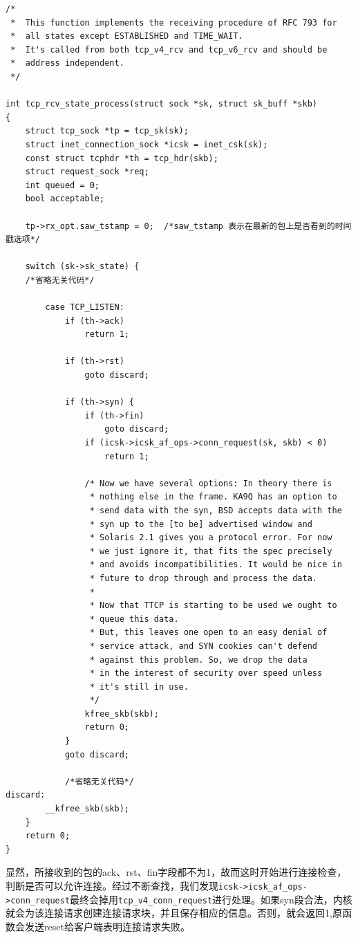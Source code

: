 \begin{verbatim}
/*
 *  This function implements the receiving procedure of RFC 793 for
 *  all states except ESTABLISHED and TIME_WAIT.
 *  It's called from both tcp_v4_rcv and tcp_v6_rcv and should be
 *  address independent.
 */

int tcp_rcv_state_process(struct sock *sk, struct sk_buff *skb)
{
    struct tcp_sock *tp = tcp_sk(sk);
    struct inet_connection_sock *icsk = inet_csk(sk);
    const struct tcphdr *th = tcp_hdr(skb);
    struct request_sock *req;
    int queued = 0;
    bool acceptable;

    tp->rx_opt.saw_tstamp = 0;  /*saw_tstamp 表示在最新的包上是否看到的时间戳选项*/

    switch (sk->sk_state) {
    /*省略无关代码*/

        case TCP_LISTEN:
            if (th->ack)
                return 1;

            if (th->rst)
                goto discard;

            if (th->syn) {
                if (th->fin)
                    goto discard;
                if (icsk->icsk_af_ops->conn_request(sk, skb) < 0)
                    return 1;

                /* Now we have several options: In theory there is
                 * nothing else in the frame. KA9Q has an option to
                 * send data with the syn, BSD accepts data with the
                 * syn up to the [to be] advertised window and
                 * Solaris 2.1 gives you a protocol error. For now
                 * we just ignore it, that fits the spec precisely
                 * and avoids incompatibilities. It would be nice in
                 * future to drop through and process the data.
                 *
                 * Now that TTCP is starting to be used we ought to
                 * queue this data.
                 * But, this leaves one open to an easy denial of
                 * service attack, and SYN cookies can't defend
                 * against this problem. So, we drop the data
                 * in the interest of security over speed unless
                 * it's still in use.
                 */
                kfree_skb(skb);
                return 0;
            }
            goto discard;

            /*省略无关代码*/
discard:
        __kfree_skb(skb);
    }
    return 0;
}
\end{verbatim}

                显然，所接收到的包的ack、rst、fin字段都不为1，故而这时开始进行连接检查，判断是否可以允许连接。经过不断查找，我们发现\texttt{icsk->icsk_af_ops->conn_request}最终会掉用\texttt{tcp_v4_conn_request}进行处理。如果syn段合法，内核就会为该连接请求创建连接请求块，并且保存相应的信息。否则，就会返回1,原函数会发送reset给客户端表明连接请求失败。

